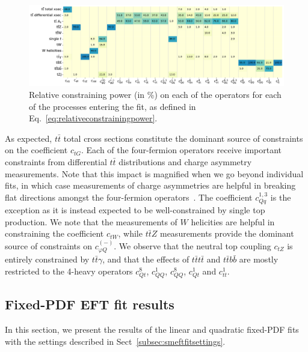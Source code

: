 \documentclass[withindex,glossary]{cam-thesis}
\begin{document}
\begin{figure}[H]
        \centering
        \includegraphics[scale=0.4]{smeft_plots/plot_fisher_information_by_sector.pdf}
	\caption{Relative constraining power (in \%) on each of the operators for each of the processes entering the fit, 
	as defined in Eq.~\eqref{eq:relativeconstrainingpower}.}
	\label{fig:fisher_diag}
\end{figure}

As expected, $t \bar{t}$ total cross sections constitute the dominant source of constraints
on the coefficient $c_{tG}$.  Each of the four-fermion operators receive important constraints
from differential $t \bar{t}$ distributions and charge asymmetry measurements.
Note that this impact is magnified when we go beyond individual fits, in which
case measurements of charge asymmetries are helpful in breaking flat directions 
amongst the four-fermion operators~\cite{Brivio:2019ius,Ellis:2020unq}.
The coefficient $c_{Qq}^{1,3}$ is the exception as it 
is instead expected to be well-constrained by single top production.  
We note that the measurements of $W$ helicities are helpful in constraining the coefficient $c_{tW}$,
while $t \bar{t} Z$ measurements provide the dominant source of constraints on $c_{\varphi Q}^{(-)}$.
We observe that the neutral top coupling $c_{tZ}$ is entirely 
constrained by $t \bar{t} \gamma$, 
and that the effects of $t \bar{t} t \bar{t}$ and $t \bar{t} b \bar{b}$ are mostly restricted to the 4-heavy operators
$c_{Qt}^{8}$, $c_{QQ}^{1}$, $c_{QQ}^{8}$, $c_{Qt}^{1}$ and $c_{tt}^{1}$. 

\subsection{Fixed-PDF EFT fit results}
\label{subsec:smeftresults}

In this section, we present the results of the linear and quadratic fixed-PDF fits
with the settings described in Sect~\ref{subsec:smeftfitsettings}. 
\end{document}

